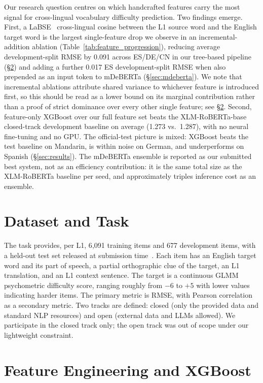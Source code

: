 \documentclass[11pt]{article}
\begin{document}
Our research question centres on which handcrafted features carry the most signal for cross-lingual vocabulary difficulty prediction. Two findings emerge. First, a LaBSE~\citep{feng2022labse} cross-lingual cosine between the L1 source word and the English target word is the largest single-feature drop we observe in an incremental-addition ablation (Table~\ref{tab:feature_progression}), reducing average development-split RMSE by 0.091 across ES/DE/CN in our tree-based pipeline (\S\ref{sec:xgb}) and adding a further 0.017 ES development-split RMSE when also prepended as an input token to mDeBERTa (\S\ref{sec:mdeberta}). We note that incremental ablations attribute shared variance to whichever feature is introduced first, so this should be read as a lower bound on its marginal contribution rather than a proof of strict dominance over every other single feature; see \S\ref{sec:xgb}. Second, feature-only XGBoost over our full feature set beats the XLM-RoBERTa-base closed-track development baseline on average (1.273 vs.\ 1.287), with no neural fine-tuning and no GPU. The official-test picture is mixed: XGBoost beats the test baseline on Mandarin, is within noise on German, and underperforms on Spanish (\S\ref{sec:results}). The mDeBERTa ensemble is reported as our submitted best system, not as an efficiency contribution: it is the same total size as the XLM-RoBERTa baseline per seed, and approximately triples inference cost as an ensemble.


\section{Dataset and Task}
\label{sec:dataset}

The task provides, per L1, 6{,}091 training items and 677 development items, with a held-out test set released at submission time~\citep{felice2026bea}. Each item has an English target word and its part of speech, a partial orthographic clue of the target, an L1 translation, and an L1 context sentence. The target is a continuous GLMM psychometric difficulty score, ranging roughly from $-6$ to $+5$ with lower values indicating harder items. The primary metric is RMSE, with Pearson correlation as a secondary metric. Two tracks are defined: closed (only the provided data and standard NLP resources) and open (external data and LLMs allowed). We participate in the closed track only; the open track was out of scope under our lightweight constraint.

\section{Feature Engineering and XGBoost}
\label{sec:xgb}
\end{document}
